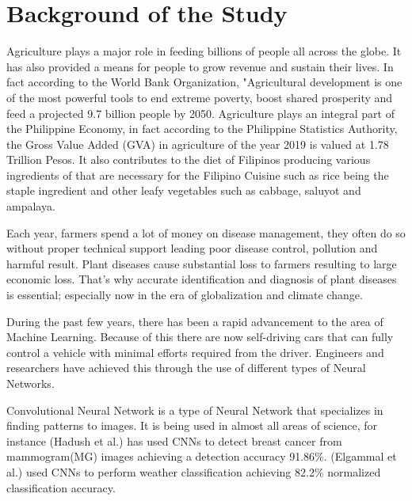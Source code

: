 
\setlength{\headheight}{15pt}
\section{Background of the Study}

Agriculture plays a major role in feeding billions of people all
across the globe. It has also provided a means for people
to grow revenue and sustain their lives. In fact according to the 
World Bank Organization, "Agricultural development 
is one of the most powerful tools to end extreme poverty, 
boost shared prosperity and feed a projected 9.7 billion people by 2050.
Agriculture plays an integral 
part of the Philippine Economy, 
in fact according to the Philippine Statistics Authority, the Gross 
Value Added (GVA) in agriculture of the year 2019
is valued at 1.78 Trillion Pesos. 
It also contributes to the diet of Filipinos producing various 
ingredients of that are necessary for the Filipino Cuisine such as rice 
being the staple ingredient and other leafy vegetables such as cabbage,
saluyot and ampalaya.  

\bigskip


Each year, farmers spend a lot of money on disease management, they 
often do so without proper technical support leading poor disease 
control, pollution and harmful result. Plant diseases cause 
substantial loss to farmers resulting to large economic loss.
That's why accurate identification and diagnosis of plant diseases is 
essential; especially now in the era of globalization and climate 
change.

\bigskip

During the past few years, there has been a rapid advancement to the
area of Machine Learning. Because of this there are now self-driving cars 
that can fully control a vehicle with minimal efforts required from the
driver. Engineers and researchers have achieved this through the use 
of different types of Neural Networks. 

\bigskip

Convolutional Neural Network is a type of Neural Network that specializes 
in finding patterns to images. It is being used in almost all areas of science, 
for instance (Hadush et al.) has used CNNs to detect breast 
cancer from mammogram(MG) images achieving a detection accuracy 91.86\%. 
(Elgammal et al.) used CNNs to perform weather classification achieving 
82.2\% normalized classification accuracy.

